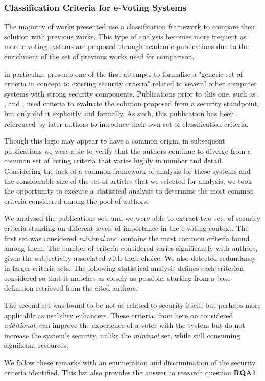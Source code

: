 \documentclass[../access.tex]{subfiles}
\begin{document}
    \subsubsection{Classification Criteria for e-Voting Systems}
    \label{classification-criteria-centralized-systems}
    The majority of works presented use a classification framework to compare their solution with previous works. This type of analysis becomes more frequent as more e-voting systems are proposed through academic publications due to the enrichment of the set of previous works used for comparison.
    \par
    \cite{Neumann1993} in particular, presents one of the first attempts to formalise a "generic set of criteria in concept to existing security criteria" related to several other computer systems with strong security components. Publications prior to this one, such as \cite{Cohen1985}, \cite{Benaloh1986a}, and \cite{Fujioka1992}, used criteria to evaluate the solution proposed from a security standpoint, but only \cite{Neumann1993} did it explicitly and formally. As such, this publication has been referenced by later authors to introduce their own set of classification criteria.
    \par
    Though this logic may appear to have a common origin, in subsequent publications we were able to verify that the authors continue to diverge from a common set of listing criteria that varies highly in number and detail. Considering the lack of a common framework of analysis for these systems and the considerable size of the set of articles that we selected for analysis, we took the opportunity to execute a statistical analysis to determine the most common criteria considered among the pool of authors.
    \par
    We analysed the publications set, and we were able to extract two sets of security criteria standing on different levels of importance in the e-voting context. The first set was considered \textit{minimal} and contains the most common criteria found among them. The number of criteria considered varies significantly with authors, given the subjectivity associated with their choice. We also detected redundancy in larger criteria sets. The following statistical analysis defines each criterion considered so that it matches as closely as possible, starting from a base definition retrieved from the cited authors.
    \par
    The second set was found to be not as related to security itself, but perhaps more applicable as usability enhancers. These criteria, from here on considered \textit{additional}, can improve the experience of a voter with the system but do not increase the system's security, unlike the \textit{minimal} set, while still consuming significant resources.
    \par
    We follow these remarks with an enumeration and discrimination of the security criteria identified. This list also provides the answer to research question \textbf{RQA1}.
\end{document}
